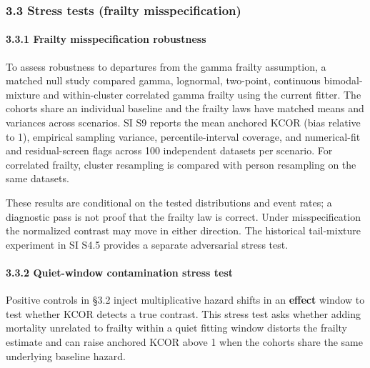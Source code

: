 \documentclass[
]{article}
\begin{document}
\subsubsection{3.3 Stress tests (frailty misspecification)}\label{stress-tests-frailty-misspecification}

\paragraph{3.3.1 Frailty misspecification robustness}\label{frailty-misspecification-robustness}

To assess robustness to departures from the gamma frailty assumption, a matched null study compared gamma, lognormal, two-point, continuous bimodal-mixture and within-cluster correlated gamma frailty using the current fitter. The cohorts share an individual baseline and the frailty laws have matched means and variances across scenarios. SI S9 reports the mean anchored KCOR (bias relative to 1), empirical sampling variance, percentile-interval coverage, and numerical-fit and residual-screen flags across 100 independent datasets per scenario. For correlated frailty, cluster resampling is compared with person resampling on the same datasets.

These results are conditional on the tested distributions and event rates; a diagnostic pass is not proof that the frailty law is correct. Under misspecification the normalized contrast may move in either direction. The historical tail-mixture experiment in SI S4.5 provides a separate adversarial stress test.

\paragraph{3.3.2 Quiet-window contamination stress test}\label{quiet-window-contamination-stress-test}

Positive controls in §3.2 inject multiplicative hazard shifts in an \textbf{effect} window to test whether KCOR detects a true contrast. This stress test asks whether adding mortality unrelated to frailty within a quiet fitting window distorts the frailty estimate and can raise anchored KCOR above 1 when the cohorts share the same underlying baseline hazard.
\end{document}

